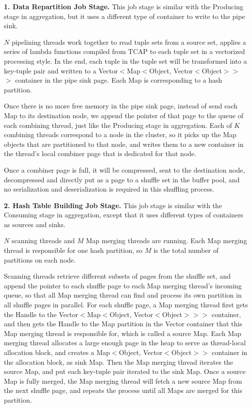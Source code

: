 \vspace{5pt}
{\bf 1. Data Repartition Job Stage.} This job stage is similar with the Producing stage in aggregation, but it uses a different type of container to write to the pipe sink. 

$N$ pipelining threads work together to read tuple sets from a source set, applies a series of lambda functions compiled from TCAP to each tuple set in a vectorized processing style. In the end, each tuple in the tuple set will be transformed into a key-tuple pair and written to a Vector$<$Map$<$Object, Vector$<$Object$>$$>$$>$ container in the pipe sink page.  Each Map is corresponding to a hash partition. 

Once there is no more free memory in the pipe sink page, instead of send each Map to its destination node, we append the pointer of that page to the queue of each combining thread, just like the Producing stage in aggregation. Each of $K$ combining threads correspond to a node in the cluster, so it picks up the Map objects that are partitioned to that node, and writes them to a new container in the thread's local combiner page that is dedicated for that node.

Once a combiner page is full, it will be compressed, sent to the destination node, decompressed and directly put as a page to a shuffle set in the buffer pool, and no serialization and deserialization is required in this shuffling process.

\vspace{5pt}
{\bf 2. Hash Table Building Job Stage.} This job stage is similar with the Consuming stage in aggregation, except  that it uses different types of containers as sources and sinks. 

$N$ scanning threads and $M$ Map merging threads are running. Each Map merging thread is responsible for one hash partition,  so $M$ is the total number of partitions on each node.

Scanning threads retrieve different subsets of pages from the shuffle set, and append the pointer to each shuffle page to each Map merging thread's incoming queue, so that all Map merging thread can find and process its own partition in all shuffle pages in parallel. For each shuffle page, a Map merging thread first gets the Handle to the Vector$<$Map$<$Object, Vector$<$Object$>$$>$$>$ container, and then gets the Handle to the Map partition in the Vector container that this Map merging thread is responsible for, which is called a source Map. Each Map merging thread allocates a large enough page in the heap to serve as thread-local allocation block, and creates a Map$<$Object, Vector$<$Object$>$$>$ container in the allocation block, as sink Map. Then the Map merging thread iterates the source Map, and put each key-tuple pair iterated to the sink Map. Once a source Map is fully merged, the Map merging thread will fetch a new source Map from the next shuffle page, and repeats the process until all Maps are merged for this partition.



